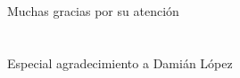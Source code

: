 \documentclass{beamer}
\begin{document}
\section{}

\begin{frame}
	\begin{center}
		Muchas gracias por su atención\\
		~\\
		~\\
		Especial agradecimiento a Damián López
	\end{center}
\end{frame}

%
%	
%	
\end{document}
